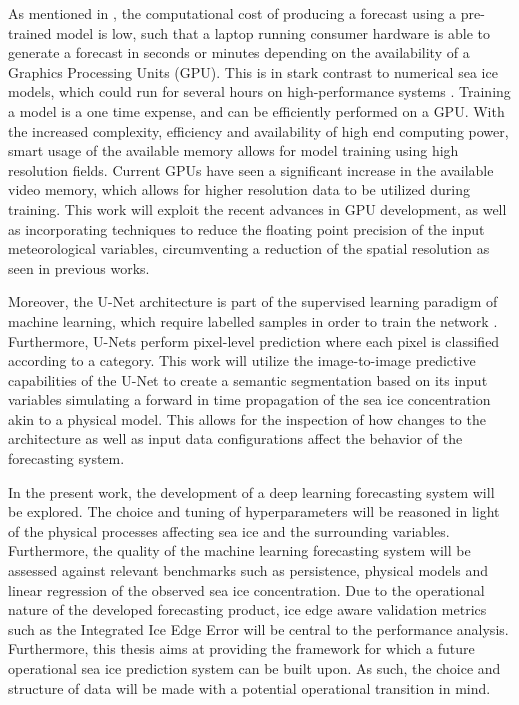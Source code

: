 \documentclass[../main/thesis.tex]{subfiles}
\begin{document}
As mentioned in \citep{Andersson2021, Fritzner2020}, the computational cost of producing a forecast using a pre-trained model is low, such that a laptop running consumer hardware is able to generate a forecast in seconds or minutes depending on the availability of a Graphics Processing Units (GPU). This is in stark contrast to numerical sea ice models, which could run for several hours on high-performance systems \citep{Andersson2021}. Training a model is a one time expense, and can be efficiently performed on a GPU. With the increased complexity, efficiency and availability of high end computing power, smart usage of the available memory allows for model training using high resolution fields. Current GPUs have seen a significant increase in the available video memory, which allows for higher resolution data to be utilized during training. This work will exploit the recent advances in GPU development, as well as incorporating techniques to reduce the floating point precision of the input meteorological variables, circumventing a reduction of the spatial resolution as seen in previous works.

Moreover, the U-Net architecture is part of the supervised learning paradigm of machine learning, which require labelled samples in order to train the network \citep{Ronneberger2015}. Furthermore, U-Nets perform pixel-level prediction where each pixel is classified according to a category. This work will utilize the image-to-image predictive capabilities of the U-Net to create a semantic segmentation based on its input variables simulating a forward in time propagation of the sea ice concentration akin to a physical model. This allows for the inspection of how changes to the architecture as well as input data configurations affect the behavior of the forecasting system.

In the present work, the development of a deep learning forecasting system will be explored. The choice and tuning of hyperparameters will be reasoned in light of the physical processes affecting sea ice and the surrounding variables. Furthermore, the quality of the machine learning forecasting system will be assessed against relevant benchmarks such as persistence, physical models and linear regression of the observed sea ice concentration. Due to the operational nature of the developed forecasting product, ice edge aware validation metrics such as the Integrated Ice Edge Error \citep{Goessling2016} will be central to the performance analysis. Furthermore, this thesis aims at providing the framework for which a future operational sea ice prediction system can be built upon. As such, the choice and structure of data will be made with a potential operational transition in mind.
\end{document}
